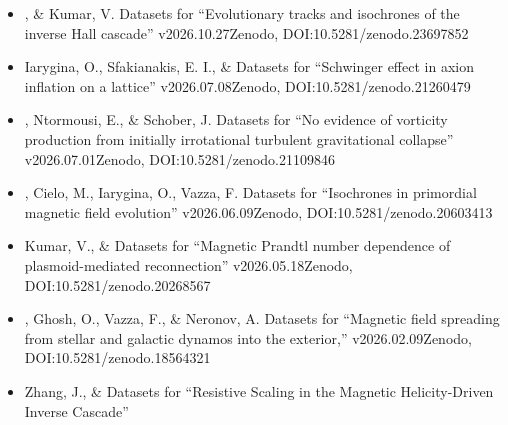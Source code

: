 \begin{itemize}

\item[{70.}~]
\Brandenburg, \& Kumar, V.
{Datasets for ``Evolutionary tracks and isochrones of the inverse Hall cascade'' v2026.10.27}{Zenodo, DOI:10.5281/zenodo.23697852}

\item[{69.}~]
Iarygina, O., Sfakianakis, E. I., \& \Brandenburg{}
{Datasets for ``Schwinger effect in axion inflation on a lattice'' v2026.07.08}{Zenodo, DOI:10.5281/zenodo.21260479}

\item[{68.}~]
\Brandenburg, Ntormousi, E., \& Schober, J.
{Datasets for ``No evidence of vorticity production from initially irrotational turbulent gravitational collapse'' v2026.07.01}{Zenodo, DOI:10.5281/zenodo.21109846}

\item[{67.}~]
\Brandenburg, Cielo, M., Iarygina, O., Vazza, F.
{Datasets for ``Isochrones in primordial magnetic field evolution'' v2026.06.09}{Zenodo, DOI:10.5281/zenodo.20603413}

\item[{66.}~]
Kumar, V., \& \Brandenburg{}
{Datasets for ``Magnetic Prandtl number dependence of plasmoid-mediated reconnection'' v2026.05.18}{Zenodo, DOI:10.5281/zenodo.20268567}

\item[{65.}~]
\Brandenburg, Ghosh, O., Vazza, F., \& Neronov, A.
{Datasets for ``Magnetic field spreading from stellar and galactic dynamos into the exterior,'' v2026.02.09}{Zenodo, DOI:10.5281/zenodo.18564321}

\item[{64.}~]
Zhang, J., \& \Brandenburg{}
{Datasets for ``Resistive Scaling in the Magnetic Helicity-Driven Inverse Cascade''}


\end{itemize}
